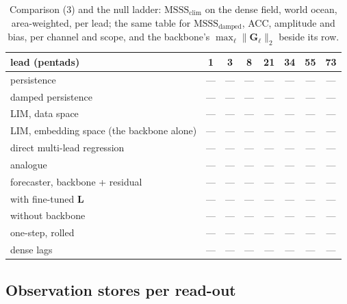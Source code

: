 \documentclass[10pt]{article}
\newcommand{\tbd}{\textcolor{ink2}{---}}
\begin{document}
\begin{table}[H]
\centering\footnotesize\setlength{\tabcolsep}{4.5pt}
\begin{tabular}{@{}l ccccccc@{}}
\toprule
lead (pentads) & 1 & 3 & 8 & 21 & 34 & 55 & 73 \\
\midrule
persistence & \tbd & \tbd & \tbd & \tbd & \tbd & \tbd & \tbd \\
damped persistence & \tbd & \tbd & \tbd & \tbd & \tbd & \tbd & \tbd \\
LIM, data space & \tbd & \tbd & \tbd & \tbd & \tbd & \tbd & \tbd \\
LIM, embedding space (the backbone alone) & \tbd & \tbd & \tbd & \tbd & \tbd & \tbd & \tbd \\
direct multi-lead regression & \tbd & \tbd & \tbd & \tbd & \tbd & \tbd & \tbd \\
analogue & \tbd & \tbd & \tbd & \tbd & \tbd & \tbd & \tbd \\
forecaster, backbone + residual & \tbd & \tbd & \tbd & \tbd & \tbd & \tbd & \tbd \\
\quad with fine-tuned $\mathbf{L}$ & \tbd & \tbd & \tbd & \tbd & \tbd & \tbd & \tbd \\
\quad without backbone & \tbd & \tbd & \tbd & \tbd & \tbd & \tbd & \tbd \\
\quad one-step, rolled & \tbd & \tbd & \tbd & \tbd & \tbd & \tbd & \tbd \\
\quad dense lags & \tbd & \tbd & \tbd & \tbd & \tbd & \tbd & \tbd \\
\bottomrule
\end{tabular}
\caption{Comparison (3) and the null ladder: $\mathrm{MSSS}_{\text{clim}}$ on
the dense field, world ocean, area-weighted, per lead; the same table for
$\mathrm{MSSS}_{\text{damped}}$, ACC, amplitude and bias, per channel and
scope, and the backbone's $\max_\ell\|\mathbf{G}_\ell\|_2$ beside its
row.\label{tab:res-forecaster}}
\end{table}

\subsection{Observation stores per read-out}
\end{document}
